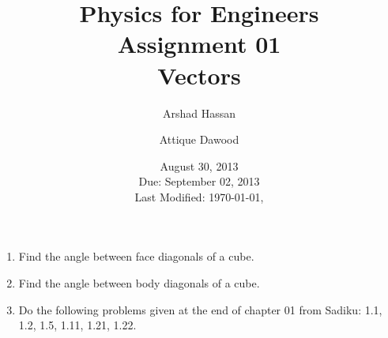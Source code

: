 \documentclass[12pt,a4paper]{article}
\title{\vspace{-2cm}Physics for Engineers\\Assignment 01\\Vectors}
\author{Arshad Hassan\and Attique Dawood}
\date{August 30, 2013\\Due: September 02, 2013\\[0.2cm] Last Modified: \today, \currenttime}
\begin{document}
\maketitle
\begin{enumerate}
\item Find the angle between face diagonals of a cube.
\item Find the angle between body diagonals of a cube.
\item Do the following problems given at the end of chapter 01 from Sadiku: 1.1, 1.2, 1.5, 1.11, 1.21, 1.22.
\end{enumerate}
\end{document}
